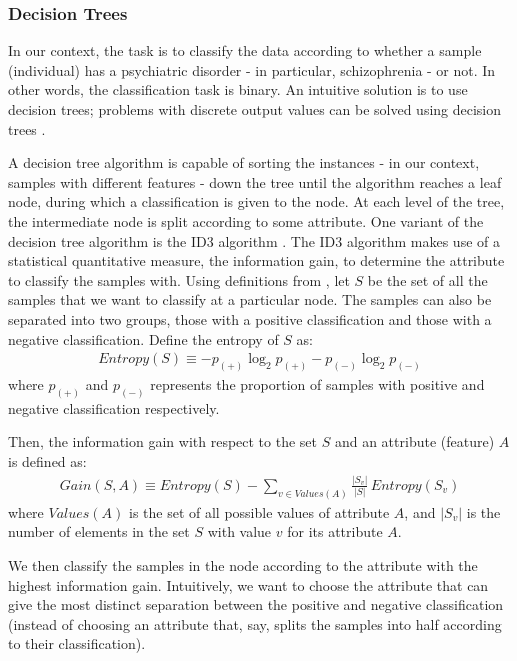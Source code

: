 \documentclass[12pt, twoside, a4paper]{article}
\begin{document}
\subsubsection{Decision Trees}
In our context, the task is to classify the data according to whether a sample (individual) has a psychiatric disorder - in particular, schizophrenia - or not. In other words, the classification task is binary. An intuitive solution is to use decision trees; problems with discrete output values can be solved using decision trees \cite{RefWorks:98}.

A decision tree algorithm is capable of sorting the  instances - in our context, samples with different features - down the tree until the algorithm reaches a leaf node, during which a classification is given to the node. At each level of the tree, the intermediate node is split according to some attribute. One variant of the decision tree algorithm is the ID3 algorithm \cite{RefWorks:99}. The ID3 algorithm makes use of a statistical quantitative measure, the information gain, to determine the attribute to classify the samples with. Using definitions from \cite{RefWorks:98}, let $S$ be the set of all the samples that we want to classify at a particular node. The samples can also be separated into two groups, those with a positive classification and those with a negative classification. Define the entropy of $S$ as:
\begin{align*}
Entropy(S) \equiv -p_{(+)} \log_2 p_{(+)} - p_{(-)} \log_2 p_{(-)}
\end{align*}
where $p_{(+)}$ and $p_{(-)}$ represents the proportion of samples with positive and negative classification respectively.

Then, the information gain with respect to the set $S$ and an attribute (feature) $A$ is defined as:
\begin{align*}
Gain(S, A) \equiv Entropy(S) - \sum_{v \in Values(A)} \frac{|S_v|}{|S|} \, Entropy(S_v)
\end{align*}
where $Values(A)$ is the set of all possible values of attribute $A$, and $|S_v|$ is the number of elements in the set $S$ with value $v$ for its attribute $A$.

We then classify the samples in the node according to the attribute with the highest information gain. Intuitively, we want to choose the attribute that can give the most distinct separation between the positive and negative classification (instead of choosing an attribute that, say, splits the samples into half  according to their classification).
\end{document}
